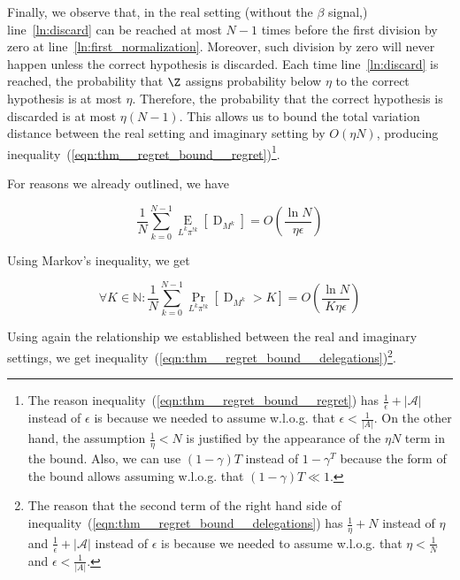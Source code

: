 \documentclass[anon,12pt]{colt2018} %
\newcommand{\AP}[1]{\left(#1\right)}
\newcommand{\AB}[1]{\left[#1\right]}
\newcommand{\Pa}[2]{\underset{#1}{\operatorname{Pr}}\AB{#2}}
\newcommand{\Ea}[2]{\underset{#1}{\operatorname{E}}\AB{#2}}
\newcommand{\Nats}{\mathbb{N}}
\newcommand{\Abs}[1]{\left\vert #1 \right\vert}
\newcommand{\A}{\mathcal{A}}
\newcommand{\ND}{\operatorname{D}}
\begin{document}
Finally, we observe that, in the real setting (without the $\beta$ signal,) line~\ref{ln:discard} can be reached at most $N-1$ times before the first division by zero at line~\ref{ln:first_normalization}. Moreover, such division by zero will never happen unless the correct hypothesis is discarded. Each time line~\ref{ln:discard} is reached, the probability that $\Z$ assigns probability below $\eta$ to the correct hypothesis is at most $\eta$. Therefore, the probability that the correct hypothesis is discarded is at most $\eta(N-1)$. This allows us to bound the total variation distance between the real setting and imaginary setting by $O(\eta N)$, producing inequality~(\ref{eqn:thm__regret_bound__regret})\footnote{The reason inequality~(\ref{eqn:thm__regret_bound__regret}) has $\frac{1}{\epsilon}+\Abs{\A}$ instead of $\epsilon$ is because we needed to assume w.l.o.g. that $\epsilon < \frac{1}{\Abs{A}}$. On the other hand, the assumption $\frac{1}{\eta}<N$ is justified by the appearance of the $\eta N$ term in the bound. Also, we can use $(1-\gamma)T$ instead of $1-\gamma^T$ because the form of the bound allows assuming w.l.o.g. that $(1-\gamma)T \ll 1$.}.

For reasons we already outlined, we have

\begin{equation}
\frac{1}{N}\sum_{k=0}^{N-1} \Ea{L^k\pi^{!k}}{\ND_{M^k}} = O\AP{\frac{\ln{N}}{\eta\epsilon}}
\end{equation}

Using Markov's inequality, we get

\begin{equation}
\forall K\in\Nats: \frac{1}{N}\sum_{k=0}^{N-1} \Pa{L^k\pi^{!k}}{\ND_{M^k}> K} = O\AP{\frac{\ln{N}}{K\eta\epsilon}}
\end{equation}

Using again the relationship we established between the real and imaginary settings, we get inequality~(\ref{eqn:thm__regret_bound__delegations})\footnote{The reason that the second term of the right hand side of inequality~(\ref{eqn:thm__regret_bound__delegations}) has $\frac{1}{\eta}+N$ instead of $\eta$ and $\frac{1}{\epsilon}+\Abs{\A}$ instead of $\epsilon$ is because we needed to assume w.l.o.g. that $\eta < \frac{1}{N}$ and $\epsilon < \frac{1}{\Abs{A}}$.}.






\appendix
\end{document}
